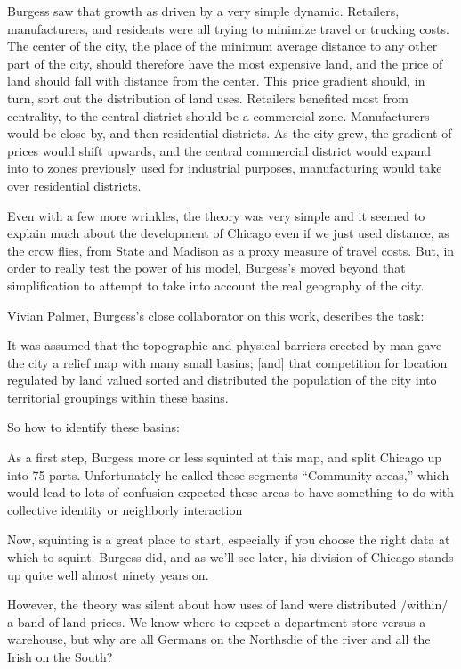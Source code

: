 Burgess saw that growth as driven by a very simple dynamic. Retailers,
manufacturers, and residents were all trying to minimize travel or
trucking costs.  The center of the city, the place of the minimum
average distance to any other part of the city, should therefore have
the most expensive land, and the price of land should fall with
distance from the center.  This price gradient should, in turn, sort
out the distribution of land uses. Retailers benefited
most from centrality, to the central district should be a commercial
zone. Manufacturers would be close by, and then residential
districts. As the city grew, the gradient of prices would shift
upwards, and the central commercial district would expand into to zones previously used for industrial purposes, manufacturing would take over residential
districts.

Even with a few more wrinkles, the theory was very simple and it
seemed to explain much about the development of Chicago even if we
just used distance, as the crow flies, from State and Madison as a
proxy measure of travel costs. But, in order to really test the power
of his model, Burgess's moved beyond that simplification to attempt to
take into account the real geography of the city.

Vivian Palmer, Burgess's close collaborator on this work, describes the task:

It was assumed that the topographic and physical barriers erected by
man gave the city a relief map with many small basins; [and] that
competition for location regulated by land valued sorted and
distributed the population of the city into territorial groupings
within these basins.

So how to identify these basins:

As a first step, Burgess more or less squinted at this map, and split
Chicago up into 75 parts. Unfortunately he called these segments
``Community areas,'' which would lead to lots of confusion expected
these areas to have something to do with collective identity or
neighborly interaction

Now, squinting is a great place to start, especially if you choose the
right data at which to squint. Burgess did, and as we'll see later,
his division of Chicago stands up quite well almost ninety years on.




However, the theory was silent about how uses of land
were distributed /within/ a band of land prices. We know where to expect
a department store versus a warehouse, but why are all Germans on the
Northsdie of the river and all the Irish on the South?

